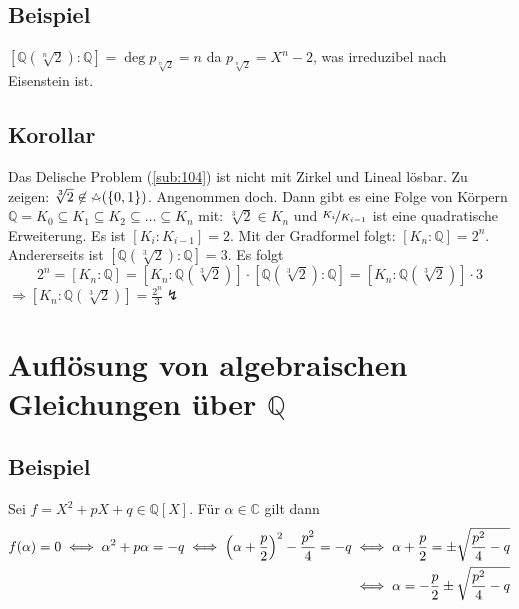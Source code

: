 \subsection[Beispiel: Begründung warum der algebraische Abschluss von $\mathds{Q}$ nicht endlich ist]{Beispiel} %
\label{sub:1133}
$[\mathds{Q}(\sqrt[n]{2}) :\mathds{Q}] = \deg p_{\sqrt[n]{2}} = n$ da $p_{\sqrt[n]{2}} = X^n -2$, was irreduzibel nach Eisenstein ist.

\subsection[Korollar: Das Delische Problem ist nicht mit Zirkel und Lineal lösbar]{Korollar} %
\label{sub:1134}
Das Delische Problem (\ref{sub:104}) ist nicht mit Zirkel und Lineal lösbar.
Zu zeigen: $\sqrt[3]{2}  \not\in \zirkel (\{0,1\})$. Angenommen doch. Dann gibt es eine Folge von Körpern $\mathds{Q}=K_0 \subseteq K_1 \subseteq K_2 \subseteq  \ldots \subseteq K_n$ mit: $\sqrt[3]{2} \in K_n  $ und $\nicefrac{K_i}{K_{i-1}}$ ist eine quadratische Erweiterung.
Es ist $[K_i : K_{i-1}] =2$. Mit der Gradformel folgt: $[K_n :\mathds{Q}] = 2^n$. Andererseits ist $[\mathds{Q}(\sqrt[3]{2}  ) :\mathds{Q}]=3$. Es folgt 
\[
	2^n = [K_n : \mathds{Q}] = \left[K_n : \mathds{Q}(\sqrt[3]{2}  )\right] \cdot \left[\mathds{Q}(\sqrt[3]{2}) :\mathds{Q}\right] 
	= \left[K_n : \mathds{Q}(\sqrt[3]{2}  )\right] \cdot 3
\]
$\Rightarrow [K_n : \mathds{Q}(\sqrt[3]{2}  )] = \frac{2^n}{3} \lightning$  \bewende
\newpage
\section{Auflösung von algebraischen Gleichungen über $\mathds{Q}$} %
\label{sec:12}
\subsection[Beispiel: $pq$-Formel]{Beispiel} %
\label{sub:12.1}
Sei $f= X^2 + pX+ q \in \mathds{Q}[X]$. Für $\alpha \in \mathds{C}$ gilt dann 
\begin{align*}
	f(\alpha)=0 \iff \alpha^2+ p \alpha= -q \iff \enbrace*{\alpha+ \frac{p}{2} }^2- \frac{p^2}{4} = -q &\iff \alpha+ \frac{p}{2} = \pm \sqrt{\frac{p^2}{4}-q }\\
	&\iff \alpha= - \frac{p}{2} \pm \sqrt{\frac{p^2}{4}-q }
\end{align*}


